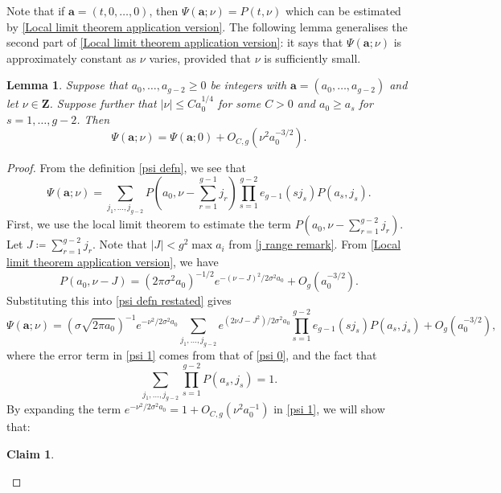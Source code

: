 \documentclass[hidelinks,11pt,reqno]{amsart}
\renewcommand{\leq}{\leqslant}
\renewcommand{\geq}{\geqslant}
\newcommand{\Z}{\ensuremath{\mathbf{Z}}}
\newcommand{\ru}[1]{e_{g-1}(#1)}
\newtheorem{lemma}[prop]{Lemma}
\newtheorem{claim}[prop]{Claim}
\theoremstyle{remark}
\begin{document}
Note that if $\mathbf{a}=(t,0,\ldots ,0)$, then $\Psi(\mathbf{a};\nu)=P(t,\nu)$ which can be estimated by \cref{Local limit theorem application version}. The following lemma generalises the second part of \cref{Local limit theorem application version}: it says that $\Psi(\mathbf{a};\nu)$ is approximately constant as $\nu$ varies, provided that $\nu$ is sufficiently small.
\begin{lemma}\label{psi lemma}
    Suppose that $a_{0},\ldots, a_{g-2}\geq 0$ be integers with $\mathbf{a}=(a_{0},\ldots, a_{g-2})$ and let $\nu\in \Z$. Suppose further that $|\nu|\leq Ca_{0}^{1/4}$ for some $C> 0$ and $a_{0}\geq a_{s}$ for $s=1,\ldots, g-2$. Then 
    \[\Psi(\mathbf{a};\nu)=\Psi(\mathbf{a};0)+O_{C,g}(\nu^{2}a_{0}^{-3/2}).\]
\end{lemma}
\begin{proof}
From the definition \cref{psi defn}, we see that
\begin{equation}\label{psi defn restated}
    \Psi(\mathbf{a};\nu)=\sum_{j_{1},\ldots, j_{g-2}}P(a_{0},\nu-\sum_{r=1}^{g-1}j_{r})\prod_{s=1}^{g-2}\ru{sj_{s}}P(a_{s},j_{s}).
\end{equation}
    First, we use the local limit theorem to estimate the term $P(a_{0},\nu-\sum_{r=1}^{g-2}j_{r})$. Let $J\coloneqq \sum_{r=1}^{g-2}j_{r}$. Note that $|J|< g^{2}\max a_{i}$ from \cref{j range remark}. From \cref{Local limit theorem application version}, we have 
    \begin{equation}\label{psi 0}
        P(a_{0},\nu-J)=(2\pi\sigma^{2}a_{0})^{-1/2}e^{-(\nu-J)^{2}/2\sigma^{2}a_{0}}+O_{g}(a_{0}^{-3/2}).
    \end{equation}
    Substituting this into \cref{psi defn restated} gives
    \begin{equation}\label{psi 1}
        \Psi(\mathbf{a};\nu)=(\sigma\sqrt{2\pi a_{0}})^{-1}e^{-\nu^{2}/2\sigma^{2}a_{0}}\sum_{j_{1},\ldots, j_{g-2}}e^{(2\nu J-J^{2})/2\sigma^{2}a_{0}}\prod_{s=1}^{g-2}\ru{sj_{s}}P(a_{s},j_{s})+O_{g}(a_{0}^{-3/2}),
    \end{equation}
    where the error term in \cref{psi 1} comes from that of \cref{psi 0}, and the fact that
    \begin{equation}\label{product of probs}
        \sum_{j_{1},\ldots, j_{g-2}}\prod_{s=1}^{g-2}P(a_{s},j_{s})=1.
    \end{equation}
By expanding the term $e^{-\nu^{2}/2\sigma^{2}a_{0}}=1+O_{C,g}(\nu^{2}a_{0}^{-1})$ in \cref{psi 1}, we will show that:
    \begin{claim}\label{psi 2 claim}
        \begin{equation}\label{psi 2 equation}

\end{equation}
\end{claim}
\end{proof}
\end{document}
